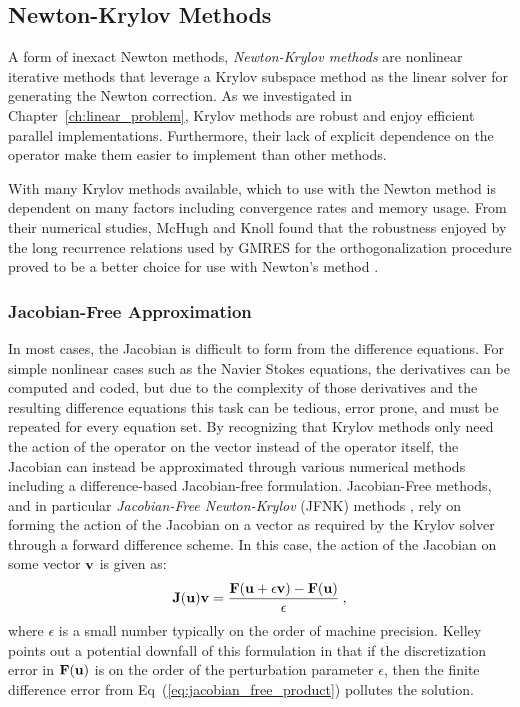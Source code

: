 \subsection{Newton-Krylov Methods}
\label{subsec:newton_krylov_methods}
A form of inexact Newton methods, \textit{Newton-Krylov methods} are
nonlinear iterative methods that leverage a Krylov subspace method as
the linear solver for generating the Newton correction. As we
investigated in Chapter~\ref{ch:linear_problem}, Krylov methods are
robust and enjoy efficient parallel implementations. Furthermore,
their lack of explicit dependence on the operator make them easier to
implement than other methods.

With many Krylov methods available, which to use with the Newton
method is dependent on many factors including convergence rates and
memory usage. From their numerical studies, McHugh and Knoll found
that the robustness enjoyed by the long recurrence relations used by
GMRES for the orthogonalization procedure proved to be a better choice
for use with Newton's method
\citep{mchugh_inexact_1993,knoll_newton-krylov_1995}.

\subsubsection{Jacobian-Free Approximation}
\label{subsubsec:jacobian_free_approximation}
In most cases, the Jacobian is difficult to form from the difference
equations. For simple nonlinear cases such as the Navier Stokes
equations, the derivatives can be computed and coded, but due to the
complexity of those derivatives and the resulting difference equations
this task can be tedious, error prone, and must be repeated for every
equation set. By recognizing that Krylov methods only need the action
of the operator on the vector instead of the operator itself, the
Jacobian can instead be approximated through various numerical methods
including a difference-based Jacobian-free formulation. Jacobian-Free
methods, and in particular \textit{Jacobian-Free Newton-Krylov} (JFNK)
methods \citep{knoll_jacobian-free_2004}, rely on forming the action
of the Jacobian on a vector as required by the Krylov solver through a
forward difference scheme. In this case, the action of the Jacobian on
some vector $\mathbf{v}$ is given as:
\begin{equation}
  \mathbf{J}(\mathbf{u})\mathbf{v} = \frac{\mathbf{F}(\mathbf{u} + \epsilon \mathbf{v}) -
    \mathbf{F}(\mathbf{u})}{\epsilon}\:,
  \label{eq:jacobian_free_product}
\end{equation}
where $\epsilon$ is a small number typically on the order of machine
precision. Kelley \citep{kelley_iterative_1995} points out a potential
downfall of this formulation in that if the discretization error in
$\mathbf{F}(\mathbf{u})$ is on the order of the perturbation parameter
$\epsilon$, then the finite difference error from
Eq~(\ref{eq:jacobian_free_product}) pollutes the solution.

